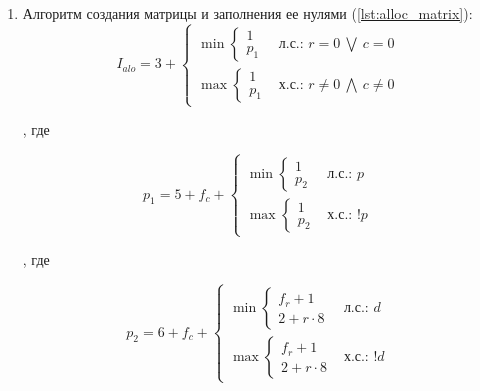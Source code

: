 \begin{enumerate}
    \item Алгоритм создания матрицы и заполнения ее нулями (\ref{lst:alloc_matrix}):
    \begin{equation*}
        I_{alo} =
        3 +
        \begin{cases}
            \min
            \begin{cases}
                1 \\
                p_1
            \end{cases} & \textit{л.с.: $r = 0~\bigvee~c = 0$ } \\
            \max
            \begin{cases}
                1 \\
                p_1
            \end{cases} & \textit{х.с.: $r \ne 0~\bigwedge~c \ne 0$}
        \end{cases}
    \end{equation*}

    , где

    \begin{equation*}
        p_1 =
        5 + f_c +
        \begin{cases}
            \min
            \begin{cases}
                1 \\
                p_2
            \end{cases} & \textit{л.с.: $p$ } \\
            \max
            \begin{cases}
                1 \\
                p_2
            \end{cases} & \textit{х.с.: $!p$ }
        \end{cases}
    \end{equation*}

    , где

    \begin{equation*}
        p_2 =
        6 + f_c + 
        \begin{cases}
            \min
            \begin{cases}
                f_r + 1 \\
                2 + r \cdot 8
            \end{cases} & \textit{л.с.: $d$ } \\
            \max
            \begin{cases}
                f_r + 1 \\
                2 + r \cdot 8
            \end{cases} & \textit{х.с.: $!d$ }
        \end{cases}
    \end{equation*}


\end{enumerate}
